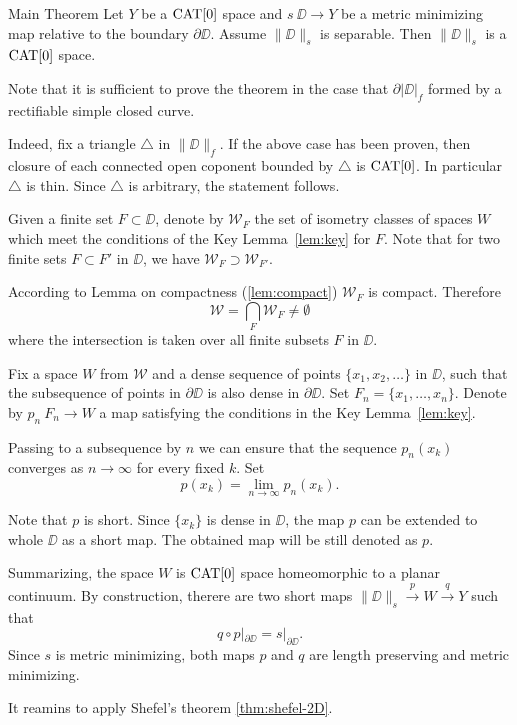 \documentclass[a4paper,10pt]{amsart}
\begin{document}
\begin{thm}{Main Theorem}\label{thm:main}
Let $Y$ be a $\mathop{\rm CAT}\nolimits[0]$ space 
and $s\:\DD\to Y$ be a metric minimizing map relative to the boundary $\partial\DD$.
Assume $\|\DD\|_s$  is separable. 
Then $\|\DD\|_s$ is a $\mathop{\rm CAT}\nolimits[0]$ space.
\end{thm}


Note that it is sufficient to prove the theorem 
in the case that $\partial |\DD|_f$ formed by a rectifiable simple closed curve.

Indeed, fix a triangle $\triangle$ in $\|\DD\|_f$.
If the above case has been proven, 
then closure of each connected open coponent bounded by $\triangle$ is $\mathop{\rm CAT}\nolimits[0]$.
In particular $\triangle$ is thin.
Since $\triangle$ is arbitrary, the statement follows.

Given a finite set $F\subset \DD$,
denote by $\mathcal{W}_F$
the set of isometry classes of spaces $W$ which meet the conditions of the Key Lemma~\ref{lem:key}
for $F$.
Note that for two finite sets $F\subset F'$ in $\DD$,
we have $\mathcal{W}_F\supset \mathcal{W}_{F'}$.

According to Lemma on compactness (\ref{lem:compact}) $\mathcal{W}_F$ is compact.
Therefore 
\[\mathcal{W}
=
\bigcap_{F}\mathcal{W}_F\ne \emptyset\]
where the intersection is taken over all finite subsets $F$ in $\DD$.

Fix a space $W$ from $\mathcal{W}$
and a dense sequence of points $\{x_1,x_2,\dots\}$ in $\DD$,
such that the subsequence of points in $\partial \DD$
is also dense in $\partial \DD$.
Set $F_n=\{x_1,\dots,x_n\}$.
Denote by $p_n\:F_n\to W$ a map satisfying the conditions in the Key Lemma~\ref{lem:key}.

Passing to a subsequence by $n$ we can ensure that the sequence
$p_n(x_k)$ converges as $n\to\infty$ for every fixed $k$.
Set 
\[p(x_k)=\lim_{n\to\infty} p_n(x_k).\]

Note that $p$ is short.
Since $\{x_k\}$ is dense in $\DD$,
the map $p$ can be extended to whole $\DD$ 
as a short map.
The obtained map will be still denoted as $p$.

Summarizing, the space $W$ is $\mathop{\rm CAT}\nolimits[0]$ space 
homeomorphic to a planar continuum.
By construction, therere are two short maps 
$\|\DD\|_s\xrightarrow{p} W \xrightarrow{q} Y$
such that 
\[q\circ p|_{\partial\DD}=s|_{\partial\DD}.\]
Since $s$ is metric minimizing, both maps $p$ and $q$ are length preserving and metric minimizing.

It reamins to apply Shefel's theorem \ref{thm:shefel-2D}.
\qeds
\end{document}
